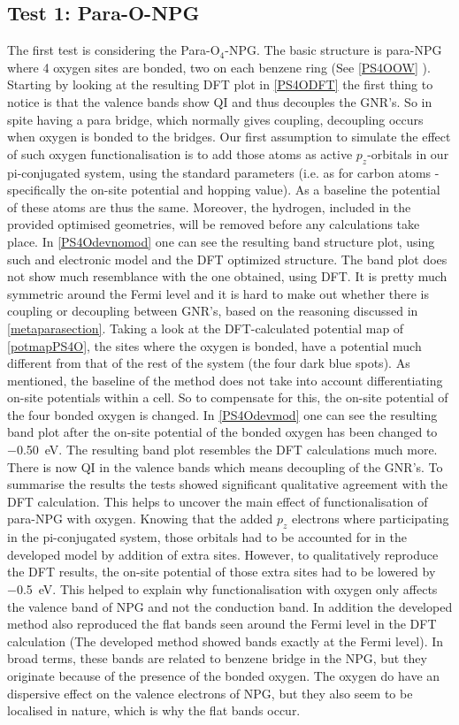 \subsection{Test 1: Para-O-NPG}\label{test1}
The first test is considering the Para-O\(_4\)-NPG. The basic structure is para-NPG where 4 oxygen sites are bonded, two on each benzene ring (See \cref{PS4OOW} ). Starting by looking at the resulting DFT plot in \cref{PS4ODFT} the first thing to notice is that the valence bands show QI and thus decouples the GNR's. So in spite having a para bridge, which normally gives coupling, decoupling occurs when oxygen is bonded to the bridges. Our first assumption to simulate the effect of such oxygen functionalisation is to add those atoms as active \(p_z\)-orbitals in our pi-conjugated system, using the standard parameters (i.e. as for carbon atoms - specifically the on-site potential and hopping value). As a baseline the potential of these atoms are thus the same. Moreover, the hydrogen, included in the provided optimised geometries, will be removed before any calculations take place. In \cref{PS4Odevnomod} one can see the resulting band structure plot, using such and electronic model and the DFT optimized structure. The band plot does not show much resemblance with the one obtained, using DFT. It is pretty much symmetric around the Fermi level and it is hard to make out whether there is coupling or decoupling between GNR's, based on the reasoning discussed in \cref{metaparasection}. Taking a look at the DFT-calculated potential map of \cref{potmapPS4O}, the sites where the oxygen is bonded, have a potential much different from that of the rest of the system (the four dark blue spots). As mentioned, the baseline of the method does not take into account differentiating on-site potentials within a cell. So to compensate for this, the on-site potential of the four bonded oxygen is changed. In \cref{PS4Odevmod} one can see the resulting band plot after the on-site potential of the bonded oxygen has been changed to \SI{-0.50}{\electronvolt}. The resulting band plot resembles the DFT calculations much more. There is now QI in the valence bands which means decoupling of the GNR's. To summarise the results the tests showed significant qualitative agreement with the DFT calculation. This helps to uncover the main effect of functionalisation of para-NPG with oxygen. Knowing that the added \(p_z\) electrons where participating in the pi-conjugated system, those orbitals had to be accounted for in the developed model by addition of extra sites. However, to qualitatively reproduce the DFT results, the on-site potential of those extra sites had to be lowered by \SI{-0.5}{\electronvolt}. This helped to explain why functionalisation with oxygen only affects the valence band of NPG and not the conduction band. In addition the developed method also reproduced the flat bands seen around the Fermi level in the DFT calculation (The developed method showed bands exactly at the Fermi level). In broad terms, these bands are related to benzene bridge in the NPG, but they originate because of the presence of the bonded oxygen. The oxygen do have an dispersive effect on the valence electrons of NPG, but they also seem to be localised in nature, which is why the flat bands occur.   
